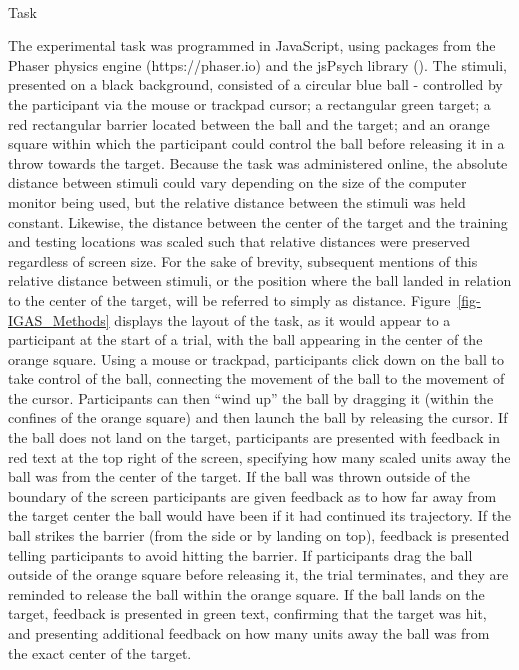 \documentclass[
  11pt,
  letterpaper,
]{article}
\makeatletter
\let\oldparagraph\paragraph
\renewcommand{\paragraph}{
    \@ifstar
      \xxxParagraphStar
      \xxxParagraphNoStar
  }
\newcommand{\xxxParagraphStar}[1]{\oldparagraph*{#1}\mbox{}}
\newcommand{\xxxParagraphNoStar}[1]{\oldparagraph{#1}\mbox{}}
\makeatother
\begin{document}
\paragraph{Task}\label{task}

The experimental task was programmed in JavaScript, using packages from
the Phaser physics engine (https://phaser.io) and the jsPsych library
().
The stimuli, presented on a black background, consisted of a circular
blue ball - controlled by the participant via the mouse or trackpad
cursor; a rectangular green target; a red rectangular barrier located
between the ball and the target; and an orange square within which the
participant could control the ball before releasing it in a throw
towards the target. Because the task was administered online, the
absolute distance between stimuli could vary depending on the size of
the computer monitor being used, but the relative distance between the
stimuli was held constant. Likewise, the distance between the center of
the target and the training and testing locations was scaled such that
relative distances were preserved regardless of screen size. For the
sake of brevity, subsequent mentions of this relative distance between
stimuli, or the position where the ball landed in relation to the center
of the target, will be referred to simply as distance.
Figure~\ref{fig-IGAS_Methods} displays the layout of the task, as it
would appear to a participant at the start of a trial, with the ball
appearing in the center of the orange square. Using a mouse or trackpad,
participants click down on the ball to take control of the ball,
connecting the movement of the ball to the movement of the cursor.
Participants can then ``wind up'' the ball by dragging it (within the
confines of the orange square) and then launch the ball by releasing the
cursor. If the ball does not land on the target, participants are
presented with feedback in red text at the top right of the screen,
specifying how many scaled units away the ball was from the center of
the target. If the ball was thrown outside of the boundary of the screen
participants are given feedback as to how far away from the target
center the ball would have been if it had continued its trajectory. If
the ball strikes the barrier (from the side or by landing on top),
feedback is presented telling participants to avoid hitting the barrier.
If participants drag the ball outside of the orange square before
releasing it, the trial terminates, and they are reminded to release the
ball within the orange square. If the ball lands on the target, feedback
is presented in green text, confirming that the target was hit, and
presenting additional feedback on how many units away the ball was from
the exact center of the target.
\end{document}
